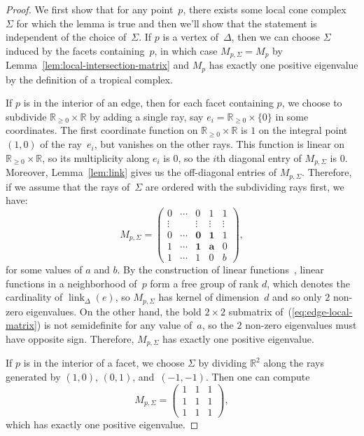 \documentclass[11pt]{amsart}
\theoremstyle{definition}
\newcommand{\link}{\operatorname{link}}
\newcommand{\RR}{\mathbb R}
\begin{document}
\begin{proof}
We first show that for any point~$p$, there exists some local cone
complex~$\Sigma$ for which the lemma is true and then we'll show that the
statement is independent of the choice of~$\Sigma$. If $p$ is a vertex
of~$\Delta$, then we can choose $\Sigma$ induced by the facets containing~$p$,
in which case $M_{p,\Sigma} = M_{p}$ by
Lemma~\ref{lem:local-intersection-matrix} and $M_p$ has exactly one positive
eigenvalue by the definition of a tropical complex.

If $p$ is in the interior of an edge, then for each facet containing $p$, we
choose to subdivide $\RR_{\geq 0} \times \RR$ by adding a single ray, say $e_i =
\RR_{\geq 0} \times \{0\}$ in some coordinates. The first coordinate function on
$\RR_{\geq 0} \times \RR$ is
$1$ on the integral point $(1,0)$ of the ray~$e_i$, but vanishes on the other
rays. This function is linear on $\RR_{\geq 0} \times \RR$, so its multiplicity
along $e_i$ is $0$, so the $i$th diagonal entry of $M_{p,\Sigma}$ is $0$.
Moreover, Lemma~\ref{lem:link} gives us the off-diagonal entries of
$M_{p,\Sigma}$. Therefore, if we assume that the rays of~$\Sigma$ are ordered
with the subdividing rays first, we have:
\begin{equation}\label{eq:edge-local-matrix}
M_{p,\Sigma} = \begin{pmatrix}
0 & \cdots & 0 & 1 & 1 \\
\vdots & & \vdots & \vdots & \vdots \\
0 & \cdots & \mathbf{0} & \mathbf{1} & 1 \\
1 & \cdots & \mathbf{1} & \mathbf{a} & 0 \\
1 & \cdots & 1 & 0 & b
\end{pmatrix},
\end{equation}
for some values of $a$ and $b$. By the construction of linear
functions~\cite[Const.~4.2]{cartwright-complexes}, linear functions in a
neighborhood of~$p$ form a free group of rank $d$, which denotes the cardinality
of $\link_\Delta(e)$, so
$M_{p,\Sigma}$ has kernel of dimension~$d$ and so only $2$ non-zero eigenvalues.
On the other hand, the bold $2 \times 2$ submatrix
of~(\ref{eq:edge-local-matrix}) is not semidefinite for any value of~$a$, so the
$2$ non-zero eigenvalues must have opposite sign. Therefore, $M_{p,\Sigma}$ has
exactly one positive eigenvalue.

If $p$ is in the interior of a facet, we choose
$\Sigma$ by dividing $\RR^2$ along the rays generated by $(1,0)$, $(0,1)$,
and~$(-1,-1)$. Then one can compute
\begin{equation*}
M_{p,\Sigma} =
\begin{pmatrix} 1 & 1 & 1 \\ 1 & 1 & 1 \\ 1 & 1 & 1 \end{pmatrix},
\end{equation*}
which has exactly one positive eigenvalue.


\end{proof}
\end{document}
